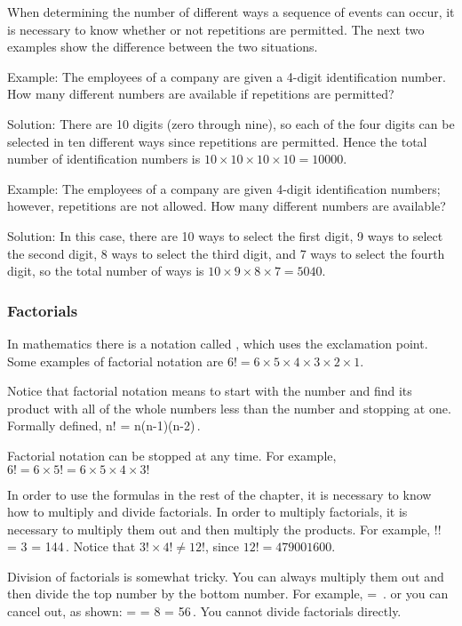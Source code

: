 When determining the number of different ways a sequence of events can occur, it is necessary to know whether or not repetitions are permitted. The next two examples show the difference between the two situations.

Example: The employees of a company are given a 4-digit identification number. How many different numbers are available if repetitions are permitted?

Solution: There are 10 digits (zero through nine), so each of the four digits can be selected in ten different ways since repetitions are permitted. Hence the total number of identification numbers is $10\times 10\times 10\times 10 = \num{10000}$.

Example: The employees of a company are given 4-digit identification numbers; however, repetitions are not allowed. How many different numbers are available?

Solution: In this case, there are 10 ways to select the first digit, 9 ways to select the second digit, 8 ways to select the third digit, and 7 ways to select the fourth digit, so the total number of ways is $10\times 9\times 8\times 7 = 5040$.


\subsubsection{Factorials}
In mathematics there is a notation called , which uses the exclamation point. Some examples of factorial notation are
$6! = 6 \times 5 \times 4 \times 3 \times 2 \times 1$.

Notice that factorial notation means to start with the number and find its product with all of the whole numbers less than the number and stopping at one. Formally defined,
\beq
n! = n\times(n-1)\times(n-2)\,.
\eeq

Factorial notation can be stopped at any time. For example, $6! = 6\times 5! = 6\times 5\times 4\times 3!$

In order to use the formulas in the rest of the chapter, it is necessary to know how to multiply and divide factorials. In order to multiply factorials, it is necessary to multiply them out and then multiply the products. For example,
!! = 3 = 144\,.
\eeq
Notice that $3!\times 4! \neq 12!$, since $12! = \num{479001600}$.

Division of factorials is somewhat tricky. You can always multiply them out and then divide the top number by the bottom number. For example,
\beq
{} = \,.
\eeq
or you can cancel out, as shown:
\beq
{} =  = 8 = 56\,.
\eeq
You cannot divide factorials directly.

